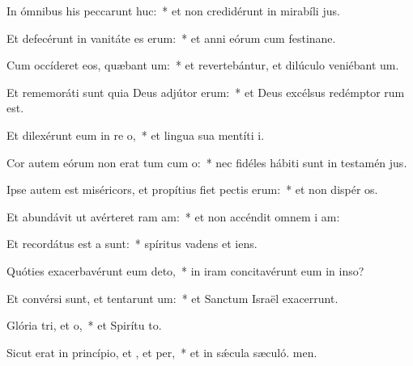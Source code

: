 \item In ómnibus his peccarunt huc:~* et non credidérunt in mirabíli jus.
\item Et defecérunt in vanitáte es erum:~* et anni eórum cum festinane.
\item Cum occíderet eos, quæbant um:~* et revertebántur, et dilúculo veniébant  um.
\item Et rememoráti sunt quia Deus adjútor  erum:~* et Deus excélsus redémptor rum est.
\item Et dilexérunt eum in re o,~* et lingua sua mentíti  i.
\item Cor autem eórum non erat tum cum o:~* nec fidéles hábiti sunt in testamén jus.
\item Ipse autem est miséricors, et propítius fiet pectis erum:~* et non dispér os.
\item Et abundávit ut avérteret ram am:~* et non accéndit omnem i am:
\item Et recordátus est a  sunt:~* spíritus vadens et  iens.
\item Quóties exacerbavérunt eum  deto,~* in iram concitavérunt eum in inso?
\item Et convérsi sunt, et tentarunt um:~* et Sanctum Israël exacerrunt.
\item Glória tri, et o,~* et Spirítu to.
\item Sicut erat in princípio, et , et per,~* et in sǽcula sæculó. men.
